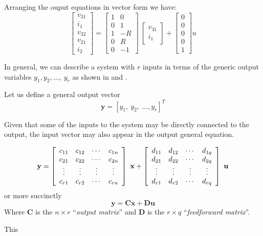 \begin{slide}
Arranging the ouput equations in vector form we have:
\begin{displaymath}
\left[\begin{array}{c}
  v_{31} \\
  i_1 \\
  v_{32} \\
  v_{21} \\
  i_2
\end{array}\right] = \left[\begin{array}{cc}
  1 & 0 \\
  0 & 1 \\
  1 & -R \\
  0 & R \\
  0 & -1
\end{array}\right]\ \left[\begin{array}{c}
  v_{31} \\
  i_1
\end{array}\right]+\left[\begin{array}{c}
  0 \\
  0 \\
  0 \\
  0 \\
  1
\end{array}\right] u
\end{displaymath}
\end{slide}
\fi
In general, we can describe a system with $r$ inputs in terms of
the generic output variables $y_1, y_2,\ldots,\ y_r$ as shown in
 and .
\begin{slide}\label{slides:l13s5}
 Let us define a general
output vector
\[\mathbf{y} = \left[y_1,\ y_2,\ \ldots, y_r\right]^T\]

Given that some of the inputs to the system may be directly
connected to the output, the input vector may also appear in the
output general equation.
\end{slide}
\begin{slide}\label{slides:l13s6}
\[
\mathbf{y}=\left[\begin{array}{cccc}
  c_{11} & c_{12} & \cdots & c_{1n} \\
  c_{21} & c_{22} & \cdots & c_{2n} \\
  \vdots & \vdots & \vdots & \vdots \\
  c_{r1} & c_{r2} & \cdots & c_{rn}
\end{array}\right]\ \mathbf{x} + \left[\begin{array}{cccc}
  d_{11} & d_{12} & \cdots & d_{1q} \\
  d_{21} & d_{22} & \cdots & d_{2q} \\
  \vdots & \vdots & \vdots & \vdots \\
  d_{r1} & d_{r2} & \cdots & d_{rq}
\end{array}\right]\ \mathbf{u} \\
\]
or more succinctly
\[
\mathbf{y}=\mathbf{C}\mathbf{x}+\mathbf{D}\mathbf{u}
\]
Where $\mathbf{C}$ is the $n\times r$ ``\emph{output matrix}'' and
$\mathbf{D}$ is the $r\times q$ ``\emph{feedforward matrix}''.
\end{slide} This

